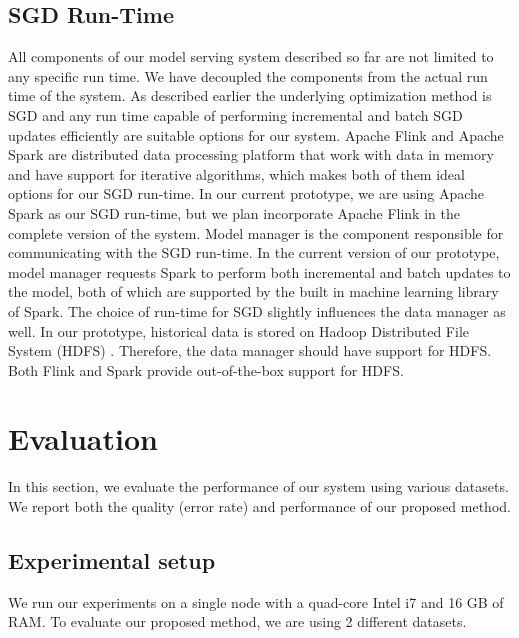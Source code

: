 \documentclass{vldb}
\begin{document}
\subsection{SGD Run-Time} 
All components of our model serving system described so far are not limited to any specific run time.
We have decoupled the components from the actual run time of the system.
As described earlier the underlying optimization method is SGD and any run time capable of performing incremental and batch SGD updates efficiently are suitable options for our system.
Apache Flink \cite{carbone2015apache} and Apache Spark \cite{zaharia2010spark} are distributed data processing platform that work with data in memory and have support for iterative algorithms, which makes both of them ideal options for our SGD run-time.
In our current prototype, we are using Apache Spark \cite{zaharia2010spark} as our SGD run-time, but we plan incorporate Apache Flink in the complete version of the system.
Model manager is the component responsible for communicating with the SGD run-time.
In the current version of our prototype, model manager requests Spark to perform both incremental and batch updates to the model, both of which are supported by the built in machine learning library of Spark.
The choice of run-time for SGD slightly influences the data manager as well.
In our prototype, historical data is stored on Hadoop Distributed File System (HDFS) \cite{shvachko2010hadoop}.
Therefore, the data manager should have support for HDFS.
Both Flink and Spark provide out-of-the-box support for HDFS.

\section{Evaluation} \label{evaluation} 
In this section, we evaluate the performance of our system using various datasets. 
We report both the quality (error rate) and performance of our proposed method. 

\subsection{Experimental setup}
We run our experiments on a single node with a quad-core Intel i7 and 16 GB of RAM. 
To evaluate our proposed method, we are using 2 different datasets.
\end{document}
